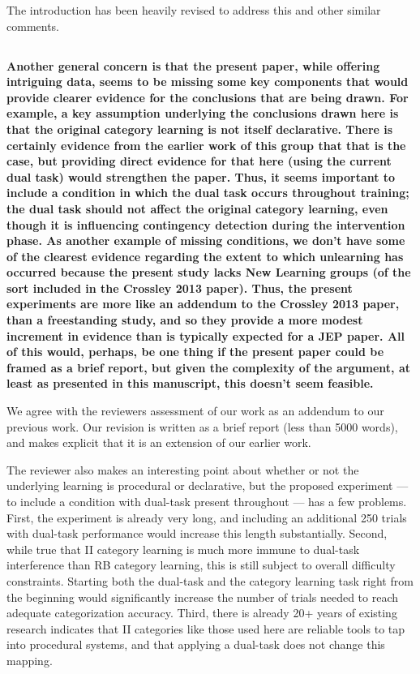 \documentclass[10pt,a4paper]{article}
\begin{document}
The introduction has been heavily revised to address this and other similar comments.

\subsection{} \textbf{
  Another general concern is that the present paper, while offering intriguing
  data, seems to be missing some key components that would provide clearer
  evidence for the conclusions that are being drawn. For example, a key assumption
  underlying the conclusions drawn here is that the original category learning is
  not itself declarative. There is certainly evidence from the earlier work of
  this group that that is the case, but providing direct evidence for that here
  (using the current dual task) would strengthen the paper. Thus, it seems
  important to include a condition in which the dual task occurs throughout
  training; the dual task should not affect the original category learning, even
  though it is influencing contingency detection during the intervention phase. As
  another example of missing conditions, we don't have some of the clearest
  evidence regarding the extent to which unlearning has occurred because the
  present study lacks New Learning groups (of the sort included in the Crossley
  2013 paper). Thus, the present experiments are more like an addendum to the
  Crossley 2013 paper, than a freestanding study, and so they provide a more
  modest increment in evidence than is typically expected for a JEP paper. All of
  this would, perhaps, be one thing if the present paper could be framed as a
  brief report, but given the complexity of the argument, at least as presented in
  this manuscript, this doesn't seem feasible.
}

We agree with the reviewers assessment of our work as an addendum to our
previous work. Our revision is written as a brief report (less than 5000 words),
and makes explicit that it is an extension of our earlier work.

The reviewer also makes an interesting point about whether or not the underlying
learning is procedural or declarative, but the proposed experiment --- to
include a condition with dual-task present throughout --- has a few problems.
First, the experiment is already very long, and including an additional 250
trials with dual-task performance would increase this length substantially.
Second, while true that II category learning is much more immune to dual-task
interference than RB category learning, this is still subject to overall
difficulty constraints. Starting both the dual-task and the category learning
task right from the beginning would significantly increase the number of trials
needed to reach adequate categorization accuracy. Third, there is already 20+
years of existing research indicates that II categories like those used here
are reliable tools to tap into procedural systems, and that applying a dual-task
does not change this mapping.
\end{document}
